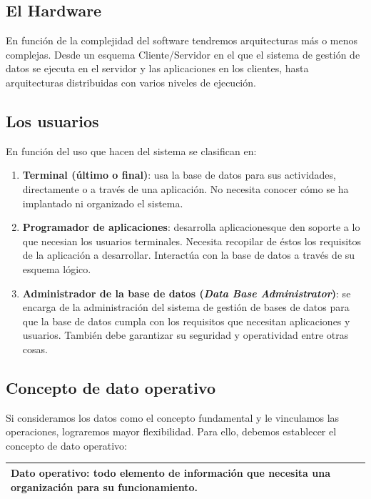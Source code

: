 \documentclass[10pt,a4paper,spanish]{report}
\begin{document}
\textcolor[rgb]{1,0.2,0.3}{\subsection{El Hardware}}
En función de la complejidad del software tendremos arquitecturas más o menos complejas. Desde un esquema Cliente/Servidor en el que el sistema de gestión de datos se ejecuta en el servidor y las aplicaciones en los clientes, hasta arquitecturas distribuidas con varios niveles de ejecución.

\textcolor[rgb]{1,0.2,0.3}{\subsection{Los usuarios}}
En función del uso que hacen del sistema se clasifican en:
\begin{enumerate}[$\heartsuit$]
    \item \textbf{\textcolor[rgb]{1,0.2,0.3}{Terminal (último o final)}}: usa la base de datos para sus actividades, directamente o a través de una aplicación. No necesita conocer cómo se ha implantado ni organizado el sistema.
    \item \textcolor[rgb]{1,0.2,0.3}{\textbf{Programador de aplicaciones}}: desarrolla aplicacionesque den soporte a lo que necesian los usuarios terminales. Necesita recopilar de éstos los requisitos de la aplicación a desarrollar. Interactúa con la base de datos a través de su esquema lógico.
    \item \textcolor[rgb]{1,0.2,0.3}{\textbf{Administrador de la base de datos (\textit{Data Base Administrator})}}: se encarga de la administración del sistema de gestión de bases de datos para que la base de datos cumpla con los requisitos que necesitan aplicaciones y usuarios. También debe garantizar su seguridad y operatividad entre otras cosas.
\end{enumerate}

\textcolor[rgb]{1,0.2,0.3}{\section{Concepto de dato operativo}}
Si consideramos los datos como el concepto fundamental y le vinculamos las operaciones, lograremos mayor flexibilidad. Para ello, debemos establecer el concepto de dato operativo:

\begin{center}
\begin{tabular}{|p{12cm}|}
\hline
\textcolor[rgb]{1,0.2,0.3}{\textbf{Dato operativo}}: todo elemento de información que necesita una organización para su funcionamiento.\\
\hline
\end{tabular}
\end{center}
\end{document}
